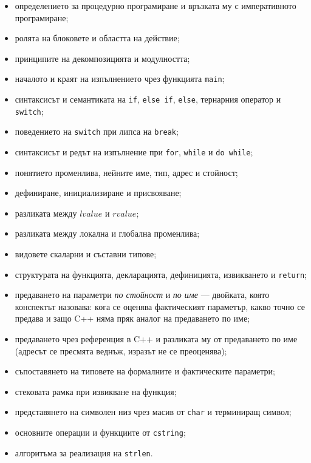 \begin{itemize}
\item определението за процедурно програмиране и връзката му с императивното програмиране;
\item ролята на блоковете и областта на действие;
\item принципите на декомпозицията и модулността;
\item началото и краят на изпълнението чрез функцията \texttt{main};
\item синтаксисът и семантиката на \texttt{if}, \texttt{else if}, \texttt{else}, тернарния оператор и \texttt{switch};
\item поведението на \texttt{switch} при липса на \texttt{break};
\item синтаксисът и редът на изпълнение при \texttt{for}, \texttt{while} и \texttt{do while};
\item понятието променлива, нейните име, тип, адрес и стойност;
\item дефиниране, инициализиране и присвояване;
\item разликата между $lvalue$ и $rvalue$;
\item разликата между локална и глобална променлива;
\item видовете скаларни и съставни типове;
\item структурата на функцията, декларацията, дефиницията, извикването и \texttt{return};
\item предаването на параметри \emph{по стойност} и \emph{по име} --- двойката, която конспектът назовава: кога се оценява фактическият параметър, какво точно се предава и защо C++ няма пряк аналог на предаването по име;
\item предаването чрез референция в C++ и разликата му от предаването по име (адресът се пресмята веднъж, изразът не се преоценява);
\item съпоставянето на типовете на формалните и фактическите параметри;
\item стековата рамка при извикване на функция;
\item представянето на символен низ чрез масив от \texttt{char} и терминиращ символ;
\item основните операции и функциите от \texttt{cstring};
\item алгоритъма за реализация на \texttt{strlen}.
\end{itemize}
